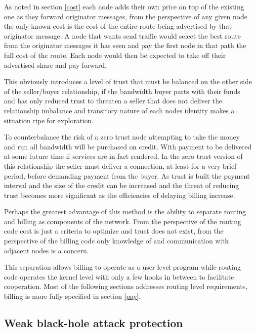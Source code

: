 \documentclass[11pt]{article}
\begin{document}
               As noted in section \ref{cost} each node adds their own price on top of the existing one as they forward originator messages, from the perspective of any given node the only known cost is the cost of the entire route being advertised by that originator message. A node that wants send traffic would select the best route from the originator messages it has seen and pay the first node in that path the full cost of the route. Each node would then be expected to take off their advertised share and pay forward. 
               
               This obviously introduces a level of trust that must be balanced on the other side of the seller/buyer relationship, if the bandwidth buyer parts with their funds and has only reduced trust to threaten a seller that does not deliver the relationship imbalance and transitory nature of each nodes identity makes a situation ripe for exploration.
               
               To counterbalance the risk of a zero trust node attempting to take the money and run all bandwidth will be purchased on credit. With payment to be delivered at some future time if services are in fact rendered. In the zero trust version of this relationship the seller must deliver a connection, at least for a very brief period, before demanding payment from the buyer. As trust is built the payment interval and the size of the credit can be increased and the threat of reducing trust becomes more significant as the efficiencies of delaying billing increase.
               
              Perhaps the greatest advantage of this method is the ability to separate routing and billing as components of the network. From the perspective of the routing code cost is just a criteria to optimize and trust does not exist, from the perspective of the billing code only knowledge of and communication with adjacent nodes is a concern.

               This separation allows billing to operate as a user level program while routing code operates the kernel level with only a few hooks in between to facilitate cooperation. Most of the following sections addresses routing level requirements, billing is more fully specified in section \ref{pay}.

    \subsection{Weak black-hole attack protection} \label{blackhole}
    
\end{document}
